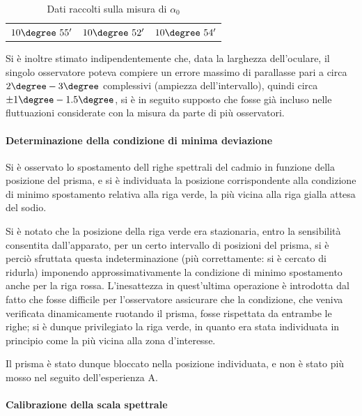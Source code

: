 \documentclass[a4paper,10pt]{article}
\begin{document}
\begin{table}[H]
	\centering
	\begin{tabular}{c|c|c}
		$10\degree~55'$  & $10\degree~52'$ & $10\degree~54'$\\
	\end{tabular}
\caption{Dati raccolti sulla misura di $\alpha_0$}
\end{table}

Si è inoltre stimato indipendentemente che, data la larghezza dell'oculare, il singolo osservatore poteva compiere un errore massimo di parallasse pari a circa $2\degree-3\degree$ complessivi (ampiezza dell'intervallo), quindi circa $\pm 1\degree-1.5\degree$, si è in seguito supposto che fosse già incluso nelle fluttuazioni considerate con la misura da parte di più osservatori.

\paragraph{Determinazione della condizione di minima deviazione} Si è osservato lo spostamento dell righe spettrali del cadmio in funzione della posizione del prisma, e si è individuata la posizione corrispondente alla condizione di minimo spostamento relativa alla riga verde, la più vicina alla riga gialla attesa del sodio.

Si è notato che la posizione della riga verde era stazionaria, entro la sensibilità consentita dall'apparato, per un certo intervallo di posizioni del prisma, si è perciò sfruttata questa indeterminazione (più correttamente: si è cercato di ridurla) imponendo approssimativamente la condizione di minimo spostamento anche per la riga rossa.
L'inesattezza in quest'ultima operazione è introdotta dal fatto che fosse difficile per l'osservatore assicurare che la condizione, che veniva verificata dinamicamente ruotando il prisma, fosse rispettata da entrambe le righe; si è dunque privilegiato la riga verde, in quanto era stata individuata in principio come la più vicina alla zona d'interesse.

Il prisma è stato dunque bloccato nella posizione individuata, e non è stato più mosso nel seguito dell'esperienza A.

\paragraph{Calibrazione della scala spettrale} 
\end{document}
